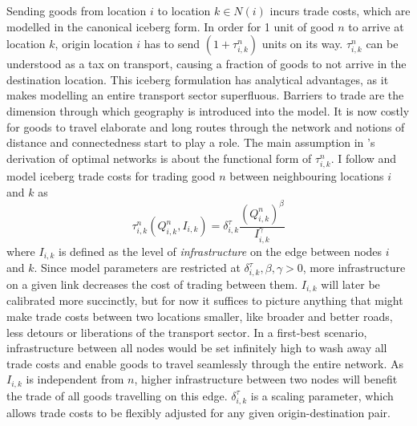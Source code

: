 \documentclass[11pt, oneside]{article}   	%
\begin{document}
Sending goods from location $i$ to location $k \in N(i)$ incurs trade costs, which are modelled in the canonical iceberg form. In order for 1 unit of good $n$ to arrive at location $k$, origin location $i$ has to send $(1+\tau_{i,k}^{n})$ units on its way. $\tau_{i,k}^{n}$ can be understood as a tax on transport, causing a fraction of goods to not arrive in the destination location. This iceberg formulation has analytical advantages, as it makes modelling an entire transport sector superfluous. Barriers to trade are the dimension through which geography is introduced into the model. It is now costly for goods to travel elaborate and long routes through the network and notions of distance and connectedness start to play a role. The main assumption in \citeauthor{fajgelbaum_optimal_2017}'s derivation of optimal networks is about the functional form of $\tau_{i,k}^{n}$. I follow \citeauthor{fajgelbaum_optimal_2017} and model iceberg trade costs for trading good $n$ between neighbouring locations $i$ and $k$ as
\begin{equation}
  \tau_{i,k}^{n}(Q_{i,k}^{n}, I_{i,k}) = \delta^{\tau}_{i,k} \frac{(Q_{i,k}^{n})^{\beta}}{I_{i,k}^{\gamma}}
  \label{eq:tau}
\end{equation}
where $I_{i,k}$ is defined as the level of \emph{infrastructure} on the edge between nodes $i$ and $k$. Since model parameters are restricted at $\delta^{\tau}_{i,k}, \beta, \gamma >0$, more infrastructure on a given link decreases the cost of trading between them. $I_{i,k}$ will later be calibrated more succinctly, but for now it suffices to picture anything that might make trade costs between two locations smaller, like broader and better roads, less detours or liberations of the transport sector. In a first-best scenario, infrastructure between all nodes would be set infinitely high to wash away all trade costs and enable goods to travel seamlessly through the entire network. As $I_{i,k}$ is independent from $n$, higher infrastructure between two nodes will benefit the trade of all goods travelling on this edge. $\delta^{\tau}_{i,k}$ is a scaling parameter, which allows trade costs to be flexibly adjusted for any given origin-destination pair.
\end{document}
